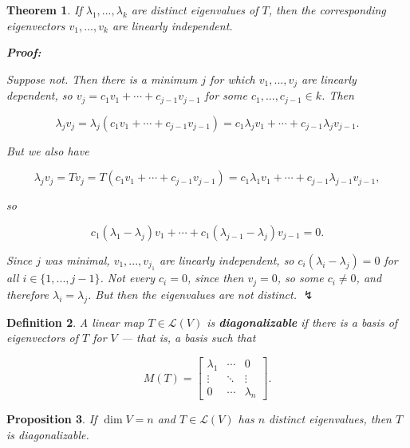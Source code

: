 \documentclass{article}
\theoremstyle{colontheorem}
\newtheorem{theorem}{Theorem}[section]
\newtheorem{proposition}[theorem]{Proposition}
\newtheorem{definition}[theorem]{Definition}
\newenvironment{Theorem}
{
	\begin{mdframed}[backgroundcolor=TheoremOrange!10]
	\begin{theorem}
}
{
	\end{theorem}
	\end{mdframed}
	
	\vspace{.15in}
}
\newenvironment{Proposition}
{
	\begin{mdframed}[backgroundcolor=PropPink!10]
	\begin{proposition}
}
{
	\end{proposition}
	\end{mdframed}
	
	\vspace{.15in}
}
\newenvironment{Def}
{
	\begin{mdframed}[backgroundcolor=DefGreen!10]
	\begin{definition}
}
{
	\end{definition}
	\end{mdframed}
	
	\vspace{.15in}
}
\newenvironment{Proof}
{
	\begin{mdframed}[backgroundcolor=ProofPurple!10]
	\textbf{Proof:}%
}
{
	\end{mdframed}
	
	\vspace{.085in}
}
\begin{document}
\begin{Theorem}
	
	If $\lambda_1, ..., \lambda_k$ are distinct eigenvalues of $T$, then the corresponding eigenvectors $v_1, ..., v_k$ are linearly independent.
	
	\begin{Proof}
		Suppose not. Then there is a minimum $j$ for which $v_1, ..., v_j$ are linearly dependent, so $v_j = c_1 v_1 + \cdots + c_{j-1} v_{j-1}$ for some $c_1, ..., c_{j-1} \in k$. Then
		
		$$
		\lambda_j v_j = \lambda_j (c_1 v_1 + \cdots + c_{j-1} v_{j-1}) = c_1 \lambda_j v_1 + \cdots + c_{j-1} \lambda_j v_{j-1}.
		$$
		
		But we also have
		
		$$
		\lambda_j v_j = Tv_j = T(c_1 v_1 + \cdots + c_{j-1} v_{j-1}) = c_1 \lambda_1 v_1 + \cdots + c_{j-1} \lambda_{j-1} v_{j-1},
		$$
		
		so
		
		$$
		c_1(\lambda_1 - \lambda_j)v_1 + \cdots + c_1(\lambda_{j-1} - \lambda_j)v_{j-1} = 0.
		$$
		
		Since $j$ was minimal, $v_1, ..., v_{j_1}$ are linearly independent, so $c_i(\lambda_i - \lambda_j) = 0$ for all $i \in \{1, ..., j-1\}$. Not every $c_i = 0$, since then $v_j = 0$, so some $c_i \neq 0$, and therefore $\lambda_i = \lambda_j$. But then the eigenvalues are not distinct. $\lightning$
		
	\end{Proof}
	
\end{Theorem}



\begin{Def}
	
	A linear map $T \in \mathcal{L}(V)$ is \textbf{diagonalizable} if there is a basis of eigenvectors of $T$ for $V$ --- that is, a basis such that
	
	$$
	M(T) = \begin{bmatrix}
		\lambda_1 & \cdots & 0\\
		\vdots & \ddots & \vdots\\
		0 & \cdots & \lambda_n
	\end{bmatrix}.
	$$
	
\end{Def}



\begin{Proposition}
	
	If $\dim V = n$ and $T \in \mathcal{L}(V)$ has $n$ distinct eigenvalues, then $T$ is diagonalizable.
	
\end{Proposition}
\end{document}
